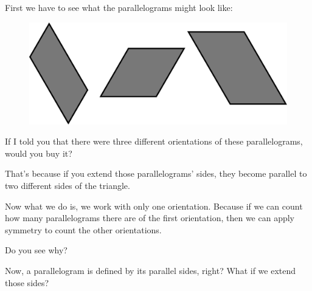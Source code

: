 \documentclass[compress]{beamer}
\begin{document}
\begin{frame}
    First we have to see what the parallelograms might look like:
 
   \begin{figure}
        \begin{center}
            \includegraphics[width=.4\linewidth]{trig_grid_3.pdf}
        \end{center}
    \end{figure}

    \pause\vspace{1em}

    If I told you that there were three different orientations of these
    parallelograms, would you buy it?

    \pause\vspace{1em}

    That's because if you extend those parallelograms' sides, they become
    parallel to two different sides of the triangle. 
\end{frame}


\begin{frame}
    Now what we do is, we work with only one orientation. Because
    \textcolor{NordBrightBlue}{if we can count how many parallelograms there
    are of the first orientation, then we can apply symmetry to count the
    other orientations.}

    \pause\vspace{1em}

    Do you see why?

    \pause\vspace{1em}

    Now, a parallelogram is defined by its parallel sides, right? What if we
    extend those sides?
\end{frame}
\end{document}
